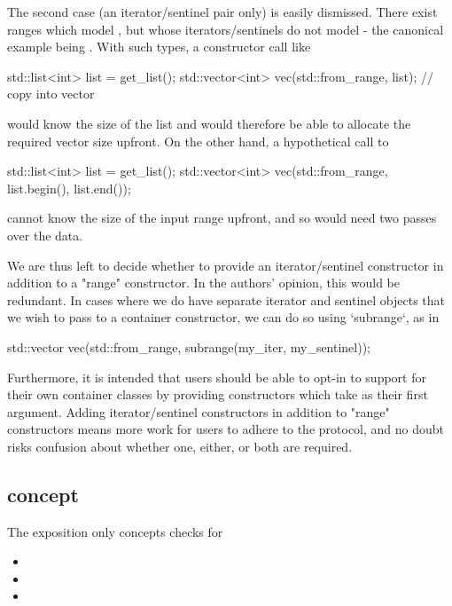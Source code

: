 \documentclass{wg21}
\begin{document}
The second case (an iterator/sentinel pair only) is easily dismissed. There exist ranges which model , but whose iterators/sentinels do not model  - the canonical example being . With such types, a constructor call like

\begin{colorblock}
std::list<int> list = get_list();
std::vector<int> vec(std::from_range, list); // copy into vector
\end{colorblock}

would know the size of the list and would therefore be able to allocate the required vector size upfront. On the other hand, a hypothetical call to

\begin{colorblock}
std::list<int> list = get_list();
std::vector<int> vec(std::from_range, list.begin(), list.end());
\end{colorblock}

cannot know the size of the input range upfront, and so would need two passes over the data.

We are thus left to decide whether to provide an iterator/sentinel constructor in addition to a "range" constructor. In the authors' opinion, this would be redundant. In cases where we do have separate iterator and sentinel objects that we wish to pass to a container constructor, we can do so using `subrange`, as in

\begin{colorblock}
std::vector vec(std::from_range, subrange(my_iter, my_sentinel));
\end{colorblock}

Furthermore, it is intended that users should be able to opt-in to  support for their own container classes by providing constructors which take  as their first argument. Adding iterator/sentinel constructors in addition to "range" constructors means more work for users to adhere to the protocol, and no doubt risks confusion about whether one, either, or both are required.

\subsection{ concept} 

The exposition only  concepts checks for
\begin{itemize}
    \item {}
    \item {}
    \item {}
\end{itemize}
\end{document}
